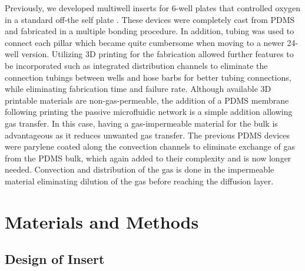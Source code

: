 Previously, we developed multiwell inserts for 6-well plates that controlled oxygen in a standard off-the self plate \cite{Oppegard2009, Oppegard2010}.
These devices were completely cast from PDMS and fabricated in a multiple bonding procedure.
In addition, tubing was used to connect each pillar which became quite cumbersome when moving to a newer 24-well version.
Utilizing 3D printing for the fabrication allowed further features to be incorporated such as integrated distribution channels to eliminate the connection tubings between wells and hose barbs for better tubing connections, while eliminating fabrication time and failure rate.
Although available 3D printable materials are non-gas-permeable, the addition of a PDMS membrane following printing the passive microfluidic network is a simple addition allowing gas transfer. 
In this case, having a gas-impermeable material for the bulk is advantageous as it reduces unwanted gas transfer. 
The previous PDMS devices were parylene coated along the convection channels to eliminate exchange of gas from the PDMS bulk, which again added to their complexity and is now longer needed.
Convection and distribution of the gas is done in the impermeable material eliminating dilution of the gas before reaching the diffusion layer. 

\section*{Materials and Methods}


\subsection*{Design of Insert}


